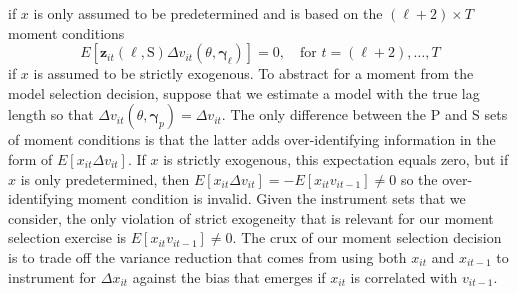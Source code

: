 if $x$ is only assumed to be predetermined and is based on the $(\ell + 2)\times T$ moment conditions 
\begin{equation}
  E\left[ \mathbf{z}_{it}(\ell,\mbox{S})\Delta v_{it}(\theta, \boldsymbol{\gamma}_\ell) \right] = 0, \quad \mbox{for } t = (\ell + 2),\dots, T 
  \label{eq:MCdpanelS}
\end{equation}
if $x$ is assumed to be strictly exogenous.
To abstract for a moment from the model selection decision, suppose that we estimate a model with the true lag length so that $\Delta v_{it}(\theta, \boldsymbol{\gamma}_p) = \Delta v_{it}$.
The only difference between the P and S sets of moment conditions is that the latter adds over-identifying information in the form of $E[x_{it}\Delta v_{it}]$.
If $x$ is strictly exogenous, this expectation equals zero, but if $x$ is only predetermined, then $E[x_{it}\Delta v_{it}] = -E[x_{it}v_{it-1}] \neq 0$ so the over-identifying moment condition is invalid.
Given the instrument sets that we consider, the only violation of strict exogeneity that is relevant for our moment selection exercise is $E[x_{it}v_{it-1}]\neq 0$.
The crux of our moment selection decision is to trade off the variance reduction that comes from using both $x_{it}$ and $x_{it-1}$ to instrument for $\Delta x_{it}$ against the bias that emerges if $x_{it}$ is correlated with $v_{it-1}$.

